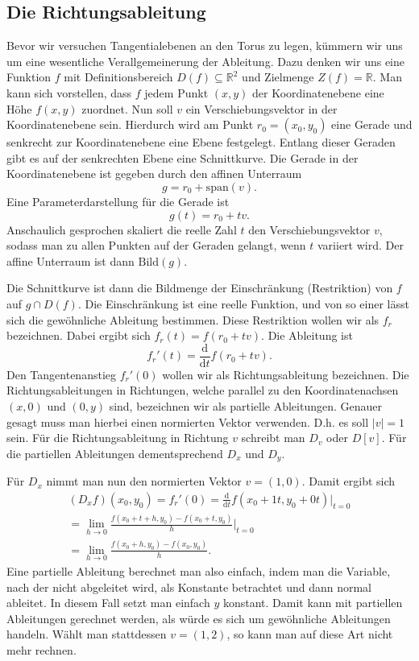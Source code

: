 \documentclass[a4paper,12pt,fleqn,dvipdfmx]{article}
\begin{document}
\subsection{Die Richtungsableitung}
Bevor wir versuchen Tangentialebenen an den Torus zu legen, kümmern
wir uns um eine wesentliche Verallgemeinerung der Ableitung. Dazu
denken wir uns eine Funktion $f$ mit Definitionsbereich
$D(f)\subseteq\mathbb R^2$ und Zielmenge $Z(f)=\mathbb R$.
Man kann sich vorstellen, dass $f$ jedem Punkt $(x,y)$ der
Koordinatenebene eine Höhe $f(x,y)$ zuordnet. Nun soll $v$ ein
Verschiebungsvektor in der Koordinatenebene sein. Hierdurch
wird am Punkt $r_0=(x_0,y_0)$ eine Gerade und senkrecht zur
Koordinatenebene eine Ebene festgelegt. Entlang dieser
Geraden gibt es auf der senkrechten Ebene eine Schnittkurve.
Die Gerade in der Koordinatenebene ist gegeben durch
den affinen Unterraum
\begin{equation}
g = r_0+\mathrm{span}(v).
\end{equation}
Eine Parameterdarstellung für die Gerade ist
\begin{equation}
g(t) = r_0+tv.
\end{equation}
Anschaulich gesprochen skaliert die reelle Zahl $t$ den
Verschiebungsvektor $v$, sodass man zu allen Punkten auf der
Geraden gelangt, wenn $t$ variiert wird.
Der affine Unterraum ist dann $\mathrm{Bild}(g)$.

Die Schnittkurve ist dann die Bildmenge der Einschränkung
(Restriktion) von $f$ auf $g\cap D(f)$. Die Einschränkung
ist eine reelle Funktion, und von so einer lässt sich die
gewöhnliche Ableitung bestimmen. Diese Restriktion wollen wir
als $f_r$ bezeichnen. Dabei ergibt sich
$f_r(t) = f(r_0+tv)$.
Die Ableitung ist
\begin{equation}\label{Restriktion}
f_r'(t) = \frac{\mathrm d}{\mathrm dt} f(r_0+tv).
\end{equation}
Den Tangentenanstieg $f_r'(0)$ wollen wir als Richtungsableitung
bezeichnen. Die Richtungsableitungen in Richtungen, welche
parallel zu den Koordinatenachsen $(x,0)$ und $(0,y)$ sind,
bezeichnen wir als partielle Ableitungen. Genauer gesagt muss man
hierbei einen normierten Vektor verwenden. D.h. es soll $|v|=1$ sein.
Für die Richtungsableitung in Richtung $v$ schreibt man $D_v$ oder
$D[v]$. Für die partiellen Ableitungen dementsprechend
$D_x$ und $D_y$.

Für $D_x$ nimmt man nun den normierten Vektor $v=(1,0)$.
Damit ergibt sich
\begin{gather*}
(D_x f)(x_0,y_0) = f_r'(0)
= \frac{\mathrm d}{\mathrm dt} f(x_0+1t,y_0+0t)\Big|_{t=0}\\
= \lim_{h\rightarrow 0} \frac{f(x_0+t+h,y_0)-f(x_0+t,y_0)}{h}\Big|_{t=0}\\
= \lim_{h\rightarrow 0} \frac{f(x_0+h,y_0)-f(x_0,y_0)}{h}.
\end{gather*}
Eine partielle Ableitung berechnet man also einfach, indem man
die Variable, nach der nicht abgeleitet wird, als Konstante
betrachtet und dann normal ableitet. In diesem Fall setzt man einfach
$y$ konstant. Damit kann mit partiellen Ableitungen gerechnet werden,
als würde es sich um gewöhnliche Ableitungen handeln. Wählt man
stattdessen $v=(1,2)$, so kann man auf diese Art nicht mehr
rechnen.
\end{document}
